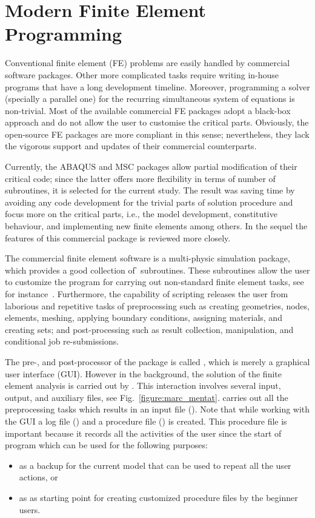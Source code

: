 \section{Modern Finite Element Programming}
	Conventional finite element (FE) problems are easily handled by commercial software packages. Other more complicated tasks require writing in-house programs that have a long development timeline. Moreover, programming a solver (specially a parallel one) for the recurring simultaneous system of equations is non-trivial. Most of the available commercial FE packages adopt a black-box approach and do not allow the user to customise the critical parts. Obviously, the open-source FE packages are more compliant in this sense; nevertheless, they lack the vigorous support and updates of their commercial counterparts. 
	
	Currently, the ABAQUS and MSC \mm{} packages allow partial modification of their critical code; since the latter offers more flexibility in terms of number of subroutines, it is selected for the current study. The result was saving time by avoiding any code development for the trivial parts of solution procedure and focus more on the critical parts, i.e., the model development, constitutive behaviour, and implementing new finite elements among others. In the sequel the features of this commercial package is reviewed more closely.
	
The \mm{} commercial finite element software is a multi-physic simulation package, which provides a good collection of \f{} subroutines. These subroutines allow the user to customize the program for carrying out non-standard finite element tasks, see for instance~\autocite{Javanbakht.2017}. Furthermore, the capability of scripting releases the user from laborious and repetitive tasks of preprocessing such as creating geometries, nodes, elements, meshing, applying boundary conditions, assigning materials, and creating sets; and post-processing such as result collection, manipulation, and conditional job re-submissions.

The pre-, and post-processor of the \mm{} package is called \M{}, which is merely a graphical user interface (GUI). However in the background, the solution of the finite element analysis is carried out by \m{}. This interaction involves several input, output, and auxiliary files, see Fig.~\ref{figure:marc_mentat}. \M{} carries out all the preprocessing tasks which results in an input file (). Note that while working with the GUI a log file () and a procedure file () is created. This procedure file is important because it records all the activities of the user since the start of program which can be used for the following purposes:
\begin{itemize}
\item as a backup for the current model that can be used to repeat all the user actions, or
\item as as starting point for creating customized procedure files by the beginner users.
\end{itemize}

